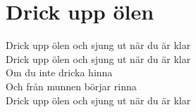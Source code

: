 \section{Drick upp ölen}
Drick upp ölen och sjung ut när du är klar\\
Drick upp ölen och sjung ut när du är klar\\
Om du inte dricka hinna\\
Och från munnen börjar rinna\\
Drick upp ölen och sjung ut när du är klar\\